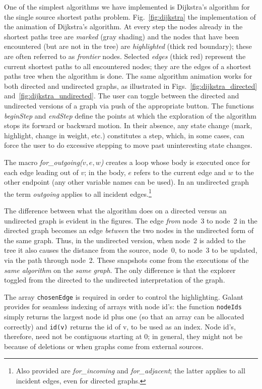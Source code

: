 One of the simplest algorithms we have implemented is Dijkstra's algorithm
for the single source shortest paths problem.
Fig.~\ref{fig:dijkstra}
the implementation of the animation of Dijkstra's algorithm.
At every step the nodes already in the shortest paths tree are \emph{marked}
(gray shading) and the nodes that have been encountered (but are not in the tree)
are \emph{highlighted} (thick red boundary); these are often referred to as
\emph{frontier} nodes.
Selected \emph{edges} (thick red) represent the current shortest paths to all
encountered nodes;
they are the edges of a shortest paths tree when the algorithm is done.
The same algorithm animation
works for both directed and undirected graphs, as illustrated
in Figs.~\ref{fig:dijkstra_directed} and~\ref{fig:dijkstra_undirected}.
The user can toggle between the directed and undirected versions of a graph
via push of the appropriate button.
The functions \emph{beginStep} and \emph{endStep} define the points at which
the exploration of the algorithm stops its forward or backward motion.
In their absence, any state change (mark, highlight, change in weight, etc.)
constitutes a step, which, in some cases, can force the user
to do excessive stepping to move past uninteresting state changes.







The macro \emph{for\_outgoing($v,e,w$)}
creates a loop whose body is executed once
for each edge leading out of $v$; in the body, $e$ refers to the current edge
and $w$ to the other endpoint (any other variable names can be used).
In an undirected graph the term \emph{outgoing} applies to all incident
edges.\footnote{
Also provided are \emph{for\_incoming} and \emph{for\_adjacent};
the latter applies to all incident edges, even for directed graphs.
}

The difference between what the algorithm does on a directed versus an undirected graph is evident in the figures.
The edge \emph{from} node~3 to node~2 in the directed graph becomes an
edge \emph{between} the two nodes in the undirected form of the same graph.
Thus, in the undirected version, when node~2 is added to the tree
it also causes the distance from the source, node~0, to node~3 to be updated,
via the path through node~2.
These snapshots come from the executions of the \emph{same algorithm} on the
\emph{same graph}.
The only difference is that the explorer toggled from the directed to
the undirected
interpretation of the graph.

The array \verb+chosenEdge+ is required in order to control the highlighting.
Galant provides for seamless indexing of arrays with node id's: the
function \verb+nodeIds+ simply returns the largest node id plus one
(so that an array can be allocated correctly) and \verb+id(v)+ returns the
id of v, to be used as an index.
Node id's, therefore, need not be contiguous starting at 0;
in general, they might not be because of deletions or when graphs
come from external sources.
